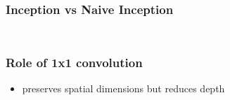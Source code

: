 \documentclass{beamer}
\begin{document}
\begin{frame}
	\frametitle{Inception vs Naive Inception}
\begin{columns}
	\begin{column}{0.5\textwidth}
		\begin{figure}
		\end{figure}
	\end{column}
	\begin{column}{0.5\textwidth}
		\begin{figure}
		\end{figure}
	\end{column}
\end{columns}
\end{frame}

\begin{frame}
	\frametitle{Role of 1x1 convolution}
\begin{itemize}
	\item preserves spatial dimensions but reduces depth
\end{itemize}
	

\end{frame}
\end{document}
